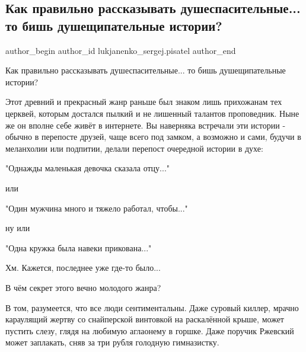  
 
 
 
 
 
\subsection{Как правильно рассказывать душеспасительные... то бишь душещипательные истории?}
\label{sec:24_08_2021.fb.lukjanenko_sergej.pisatel.1.dusheschipatelnyje_istorii}
 
\ifcmt
 author_begin
   author_id lukjanenko_sergej.pisatel
 author_end
\fi

Как правильно рассказывать душеспасительные... то бишь душещипательные истории?

Этот древний и прекрасный жанр раньше был знаком лишь прихожанам тех церквей,
которым достался пылкий и не лишенный талантов проповедник. Ныне же он вполне
себе живёт в интернете. Вы наверняка встречали эти истории - обычно в перепосте
друзей, чаще всего под замком, а возможно и сами, будучи в меланхолии или
подпитии, делали перепост очередной истории в духе:

"Однажды маленькая девочка сказала отцу..."

или

"Один мужчина много и тяжело работал, чтобы..."

ну или

"Одна кружка была навеки прикована..."

Хм. Кажется, последнее уже где-то было...

В чём секрет этого вечно молодого жанра?

В том, разумеется, что все люди сентиментальны. Даже суровый киллер, мрачно
караулящий жертву со снайперской винтовкой на раскалённой крыше, может пустить
слезу, глядя на любимую аглаонему в горшке. Даже поручик Ржевский может
заплакать, сняв за три рубля голодную гимназистку.

